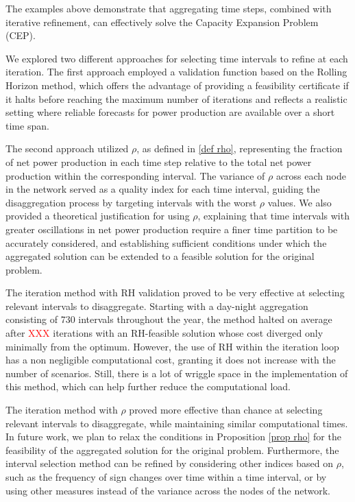 \documentclass[smallextended,natbib]{svjour3}       %
\numberwithin{theorem}{section}
\begin{document}
The examples above demonstrate that aggregating time steps, combined with iterative refinement, can effectively solve the Capacity Expansion Problem (CEP). 

We explored two different approaches for selecting time intervals to refine at each iteration. The first approach employed a validation function based on the Rolling Horizon method, which offers the advantage of providing a feasibility certificate if it halts before reaching the maximum number of iterations and reflects a realistic setting where reliable forecasts for power production are available over a short time span.

The second approach utilized \(\rho\), as defined in \ref{def rho}, representing the fraction of net power production in each time step relative to the total net power production within the corresponding interval. 
The variance of \(\rho\) across each node in the network served as a quality index for each time interval, guiding the disaggregation process by targeting intervals with the worst \(\rho\) values. 
We also provided a theoretical justification for using \(\rho\), explaining that time intervals with greater oscillations in net power production require a finer time partition to be accurately considered, and establishing sufficient conditions under which the aggregated solution can be extended to a feasible solution for the original problem.

The iteration method with RH validation proved to be very effective at selecting relevant intervals to disaggregate. Starting with a day-night aggregation consisting of 730 intervals throughout the year, the method halted on average after \textcolor{red}{XXX} iterations with an RH-feasible solution whose cost diverged only minimally from the optimum.
However, the use of RH within the iteration loop has a non negligible computational cost, granting it does not increase with the number of scenarios. Still, there is a lot of wriggle space in the implementation of this method, which can help further reduce the computational load.

The iteration method with $\rho$ proved more effective than chance at selecting relevant intervals to disaggregate, while maintaining similar computational times.
In future work, we plan to relax the conditions in Proposition \ref{prop rho} for the feasibility of the aggregated solution for the original problem. Furthermore, the interval selection method can be refined by considering other indices based on \(\rho\), such as the frequency of sign changes over time within a time interval, or by using other measures instead of the variance across the nodes of the network.
\end{document}
